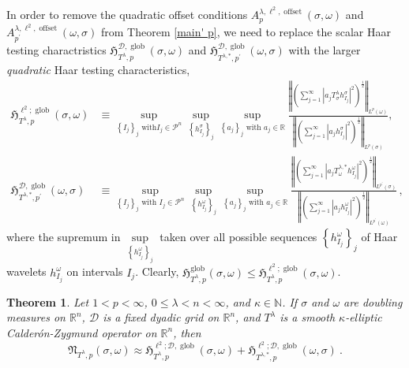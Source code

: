 \documentclass{amsart}%
\newtheorem{theorem}{Theorem}
\theoremstyle{plain}
\numberwithin{equation}{section}
\begin{document}
In order to remove the quadratic offset conditions $A_{p}^{\lambda,\ell
^{2},\operatorname*{offset}}\left(  \sigma,\omega\right)  $ and $A_{p^{\prime
}}^{\lambda,\ell^{2},\operatorname*{offset}}\left(  \omega,\sigma\right)  $
from Theorem \ref{main' p}, we need to replace the
scalar Haar testing charactristics $\mathfrak{H}_{T^{\lambda},p}%
^{\mathcal{D},\operatorname*{glob}}\left(  \sigma,\omega\right)  $ and
$\mathfrak{H}_{T^{\lambda,\ast},p^{\prime}}^{\mathcal{D},\operatorname*{glob}%
}\left(  \omega,\sigma\right)  $ with the larger \emph{quadratic} Haar testing
characteristics,%
\begin{align*}
\mathfrak{H}_{T^{\lambda},p}^{\ell^{2};\operatorname*{glob}}\left(
\sigma,\omega\right)   &  \equiv\sup_{\left\{  I_{j}\right\}  _{j}\text{ with
}I_{j}\in\mathcal{P}^{n}}\sup\limits_{\left\{  h_{I_{j}}^{\sigma}\right\}
_{j}}\sup_{\left\{  a_{j}\right\}  _{j}\text{ with }a_{j}\in\mathbb{R}}%
\frac{\left\Vert \left(  \sum_{j=1}^{\infty}\left\vert a_{j}T_{\sigma
}^{\lambda}h_{I_{j}}^{\sigma}\right\vert ^{2}\right)  ^{\frac{1}{2}%
}\right\Vert _{L^{p}\left(  \omega\right)  }}{\left\Vert \left(  \sum
_{j=1}^{\infty}\left\vert a_{j}h_{I_{j}}^{\sigma}\right\vert ^{2}\right)
^{\frac{1}{2}}\right\Vert _{L^{p}\left(  \sigma\right)  }},\\
\mathfrak{H}_{T^{\lambda,\ast},p^{\prime}}^{\mathcal{D},\operatorname*{glob}%
}\left(  \omega,\sigma\right)   &  \equiv\sup_{\left\{  I_{j}\right\}
_{j}\text{ with }I_{j}\in\mathcal{P}^{n}}\sup\limits_{\left\{  h_{I_{j}%
}^{\omega}\right\}  _{j}}\sup_{\left\{  a_{j}\right\}  _{j}\text{ with }%
a_{j}\in\mathbb{R}}\frac{\left\Vert \left(  \sum_{j=1}^{\infty}\left\vert
a_{j}T_{\omega}^{\lambda,\ast}h_{I_{j}}^{\omega}\right\vert ^{2}\right)
^{\frac{1}{2}}\right\Vert _{L^{p^{\prime}}\left(  \sigma\right)  }}{\left\Vert
\left(  \sum_{j=1}^{\infty}\left\vert a_{j}h_{I_{j}}^{\omega}\right\vert
^{2}\right)  ^{\frac{1}{2}}\right\Vert _{L^{p^{\prime}}\left(  \omega\right)
}}\,,
\end{align*}
where the supremum in  $\sup\limits_{\left\{  h_{I_{j}}^{\omega}\right\}
_{j}}$ taken over all possible sequences $\left\{  h_{I_{j}}^{\omega}\right\}
_{j}$ of Haar wavelets $h_{I_{j}}^{\omega}$ on intervals $I_{j}$.
Clearly, $\mathfrak{H}_{T^{\lambda},p}^{\operatorname*{glob}}\left(
\sigma,\omega\right)  \leq\mathfrak{H}_{T^{\lambda},p}^{\ell^{2}%
;\operatorname*{glob}}\left(  \sigma,\omega\right)  $.

\begin{theorem}
\label{theorem:Lp_Haar_quad} \label{main' p glob}Let $1<p<\infty$,
$0\leq\lambda<n<\infty$, and $\kappa\in\mathbb{N}$. If $\sigma$ and $\omega$
are doubling measures on $\mathbb{R}^{n}$, $\mathcal{D}$ is a \emph{fixed}
dyadic grid on $\mathbb{R}^{n}$, and $T^{\lambda}$ is a smooth $\kappa
$-elliptic Calder\'{o}n-Zygmund operator on $\mathbb{R}^{n}$, then%
\[
\mathfrak{N}_{T^{\lambda},p}\left(  \sigma,\omega\right)  \approx
\mathfrak{H}_{T^{\lambda},p}^{\ell^{2};\mathcal{D},\operatorname*{glob}%
}\left(  \sigma,\omega\right)  +\mathfrak{H}_{T^{\lambda,\ast},p}^{\ell
^{2};\mathcal{D},\operatorname*{glob}}\left(  \omega,\sigma\right)  \ .
\]

\end{theorem}
\end{document}

